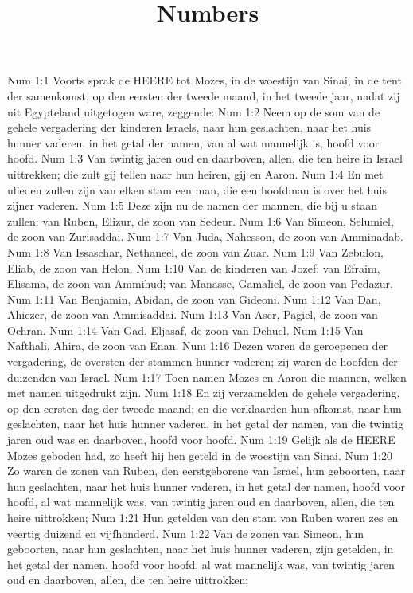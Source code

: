 

\title{Numbers}


Num 1:1  Voorts sprak de HEERE tot Mozes, in de woestijn van Sinai, in de tent der samenkomst, op den eersten der tweede maand, in het tweede jaar, nadat zij uit Egypteland uitgetogen ware, zeggende:
Num 1:2  Neem op de som van de gehele vergadering der kinderen Israels, naar hun geslachten, naar het huis hunner vaderen, in het getal der namen, van al wat mannelijk is, hoofd voor hoofd.
Num 1:3  Van twintig jaren oud en daarboven, allen, die ten heire in Israel uittrekken; die zult gij tellen naar hun heiren, gij en Aaron.
Num 1:4  En met ulieden zullen zijn van elken stam een man, die een hoofdman is over het huis zijner vaderen.
Num 1:5  Deze zijn nu de namen der mannen, die bij u staan zullen: van Ruben, Elizur, de zoon van Sedeur.
Num 1:6  Van Simeon, Selumiel, de zoon van Zurisaddai.
Num 1:7  Van Juda, Nahesson, de zoon van Amminadab.
Num 1:8  Van Issaschar, Nethaneel, de zoon van Zuar.
Num 1:9  Van Zebulon, Eliab, de zoon van Helon.
Num 1:10  Van de kinderen van Jozef: van Efraim, Elisama, de zoon van Ammihud; van Manasse, Gamaliel, de zoon van Pedazur.
Num 1:11  Van Benjamin, Abidan, de zoon van Gideoni.
Num 1:12  Van Dan, Ahiezer, de zoon van Ammisaddai.
Num 1:13  Van Aser, Pagiel, de zoon van Ochran.
Num 1:14  Van Gad, Eljasaf, de zoon van Dehuel.
Num 1:15  Van Nafthali, Ahira, de zoon van Enan.
Num 1:16  Dezen waren de geroepenen der vergadering, de oversten der stammen hunner vaderen; zij waren de hoofden der duizenden van Israel.
Num 1:17  Toen namen Mozes en Aaron die mannen, welken met namen uitgedrukt zijn.
Num 1:18  En zij verzamelden de gehele vergadering, op den eersten dag der tweede maand; en die verklaarden hun afkomst, naar hun geslachten, naar het huis hunner vaderen, in het getal der namen, van die twintig jaren oud was en daarboven, hoofd voor hoofd.
Num 1:19  Gelijk als de HEERE Mozes geboden had, zo heeft hij hen geteld in de woestijn van Sinai.
Num 1:20  Zo waren de zonen van Ruben, den eerstgeborene van Israel, hun geboorten, naar hun geslachten, naar het huis hunner vaderen, in het getal der namen, hoofd voor hoofd, al wat mannelijk was, van twintig jaren oud en daarboven, allen, die ten heire uittrokken;
Num 1:21  Hun getelden van den stam van Ruben waren zes en veertig duizend en vijfhonderd.
Num 1:22  Van de zonen van Simeon, hun geboorten, naar hun geslachten, naar het huis hunner vaderen, zijn getelden, in het getal der namen, hoofd voor hoofd, al wat mannelijk was, van twintig jaren oud en daarboven, allen, die ten heire uittrokken;
